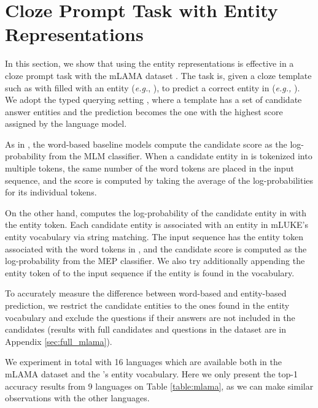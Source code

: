 \documentclass[11pt]{article}
\newcommand{\minisection}[1]{\noindent{\bf {#1}.}}
\newcommand{\Appendix}[1]{Appendix \ref{#1}}
\newcommand{\Table}[1]{Table \ref{#1}}
\begin{document}
 \section{Cloze Prompt Task with Entity Representations}

In this section, we show that using the entity representations is effective in a cloze prompt task \citep{Liu2021PretrainPA} with the mLAMA dataset \citep{kassner-etal-2021-multilingual}.
The task is, given a cloze template such as  with \X{} filled with an entity ({\it e.g.}, ), to predict a correct entity in \Y{} ({\it e.g.,} ).
We adopt the typed querying setting \citep{kassner-etal-2021-multilingual}, where a template has a set of candidate answer entities and the prediction becomes the one with the highest score assigned by the language model.

\minisection{Model}
As in \citet{kassner-etal-2021-multilingual}, the word-based baseline models compute the candidate score as the log-probability from the MLM classifier.
When a candidate entity in \Y{} is tokenized into multiple tokens, the same number of the word \mask{} tokens are placed in the input sequence, and the score is computed by taking the average of the log-probabilities for its individual tokens.

On the other hand, \mlukeE{} computes the log-probability of the candidate entity in \Y{} with the entity \mask{} token.
Each candidate entity is associated with an entity in mLUKE's entity vocabulary via string matching.
The input sequence has the entity \mask{} token associated with the word \mask{} tokens in \Y{}, and the candidate score is computed as the log-probability from the MEP classifier.
We also try additionally appending the entity token of \X{} to the input sequence if the entity is found in the vocabulary.

To accurately measure the difference between word-based and entity-based prediction, we restrict the candidate entities to the ones found in the entity vocabulary and exclude the questions if their answers are not included in the candidates (results with full candidates and questions in the dataset are in \Appendix{sec:full_mlama}).


\minisection{Results}
We experiment in total with 16 languages which are available both in the mLAMA dataset and the \mluke{}'s entity vocabulary.
Here we only present the top-1 accuracy results from 9 languages on \Table{table:mlama}, as we can make similar observations with the other languages.
\end{document}
